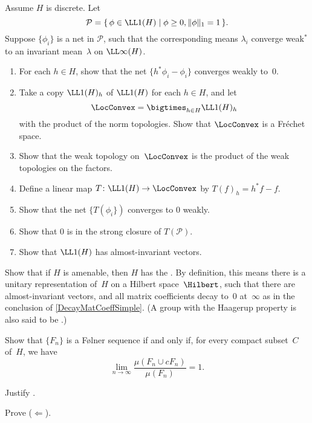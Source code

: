 \begin{exercises}
\item \label{Amen->VectorsEx}
Assume $H$ is discrete. Let 
	$$\mathcal{P} = \{\, \phi \in \LL1(H) \mid \phi \ge 0, \|\phi\|_1 = 1 \,\} .$$
Suppose $\{\phi_i\}$ is a net in $\mathcal{P}$, such that the corresponding means $\lambda_i$ converge weak$^*$ to an invariant mean~$\lambda$ on $\LL\infty(H)$.
	\begin{enumerate}
	\item For each $h \in H$, show that the net $\{h^*\phi_i - \phi_i\}$ converges weakly to~$0$.
	\item Take a copy $\LL1(H)_h$ of $\LL1(H)$ for each $h \in H$, and let 		$$\LocConvex = \bigtimes_{h \in H} \LL1(H)_h $$
	with the product of the norm topologies. Show that $\LocConvex$ is a Fréchet space.
	\item Show that the weak topology on~$\LocConvex$ is the product of the weak topologies on the factors.
	\item Define a linear map $T \colon \LL1(H) \to \LocConvex$ by $T(f)_h = h^* f - f$.
	\item Show that the net $\{T(\phi_i\})$ converges to $0$ weakly.
	\item Show that $0$ is in the strong closure of $T(\mathcal{P})$.
	\item Show that $\LL1(H)$ has almost-invariant vectors.
	\end{enumerate}

\item Show that if $H$ is amenable, then $H$ has the . By definition, this means there is a unitary representation of~$H$ on a Hilbert space~$\Hilbert$, such that there are almost-invariant vectors, and all matrix coefficients decay to~$0$ at~$\infty$ as in the conclusion of \cref{DecayMatCoeffSimple}. (A group with the Haagerup property is also said to be .)



\item Show that $\{F_n\}$ is a F\o lner sequence if and only if, for every compact subset~$C$ of~$H$, we have
	$$ \lim_{n \to \infty} \frac{ \mu( F_n \cup c F_n) }{ \mu(F_n) } = 1 .$$

\item \label{FolnerRlEx}
Justify .

\item \label{Amen<-Folner}
Prove ($\Leftarrow$).


\end{exercises}
